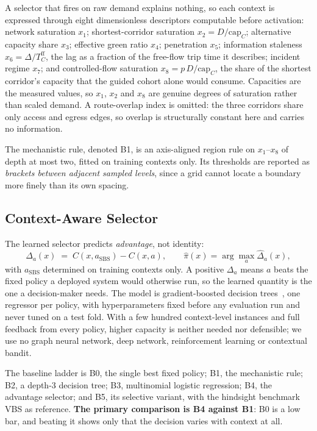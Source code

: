 A selector that fires on raw demand explains nothing, so each context is
expressed through eight dimensionless descriptors computable before activation:
network saturation $x_1$; shortest-corridor saturation
$x_2 = D/\mathrm{cap}_C$; alternative capacity share $x_3$; effective green
ratio $x_4$; penetration $x_5$; information staleness
$x_6 = \Delta/T^{\mathrm{ff}}_C$, the lag as a fraction of the free-flow trip
time it describes; incident regime $x_7$; and controlled-flow saturation
$x_8 = p\,D/\mathrm{cap}_C$, the share of the shortest corridor's capacity that
the guided cohort alone would consume. Capacities are the measured values, so
$x_1$, $x_2$ and $x_8$ are genuine degrees of saturation rather than scaled
demand. A route-overlap index is omitted: the three corridors share only access
and egress edges, so overlap is structurally constant here and carries no
information.

The mechanistic rule, denoted B1, is an axis-aligned region rule on
$x_1$--$x_8$ of depth at most two, fitted on training contexts only. Its
thresholds are reported as \emph{brackets between adjacent sampled levels},
since a grid cannot locate a boundary more finely than its own spacing.

\subsection{Context-Aware Selector}

The learned selector predicts \emph{advantage}, not identity:
\begin{equation}
\Delta_a(x) \;=\; C(x, a_{\mathrm{SBS}}) - C(x,a),
\qquad \hat{\pi}(x) = \arg\max_a \hat{\Delta}_a(x),
\label{eq:advantage}
\end{equation}
with $a_{\mathrm{SBS}}$ determined on training contexts only. A positive
$\Delta_a$ means $a$ beats the fixed policy a deployed system would otherwise
run, so the learned quantity is the one a decision-maker needs. The model is
gradient-boosted decision trees~\cite{friedman2001gbm,ke2017lightgbm}, one
regressor per policy, with hyperparameters fixed before any evaluation run and
never tuned on a test fold. With a few hundred context-level instances and full
feedback from every policy, higher capacity is neither needed nor defensible;
we use no graph neural network, deep network, reinforcement learning or
contextual bandit.

The baseline ladder is B0, the single best fixed policy; B1, the mechanistic
rule; B2, a depth-3 decision tree; B3, multinomial logistic regression; B4, the
advantage selector; and B5, its selective variant, with the hindsight benchmark
VBS as reference. \textbf{The primary comparison is B4 against B1}: B0 is a low
bar, and beating it shows only that the decision varies with context at all.

